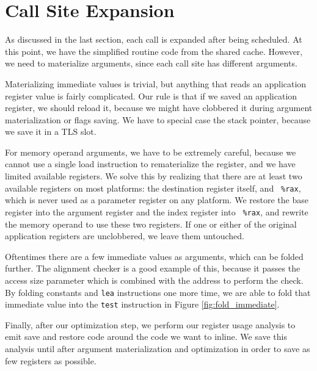 \section{Call Site Expansion}
\label{sec:site_expansion}

As discussed in the last section, each call is expanded after being scheduled.
At this point, we have the simplified routine code from the shared cache.
However, we need to materialize arguments, since each call site has different
arguments.

Materializing immediate values is trivial, but anything that reads an
application register value is fairly complicated.  Our rule is that if we saved
an application register, we should reload it, because we might have clobbered it
during argument materialization or flags saving.  We have to special case the
stack pointer, because we save it in a TLS slot.

For memory operand arguments, we have to be extremely careful, because we cannot
use a single load instruction to rematerialize the register, and we have limited
available registers.  We solve this by realizing that there are at least two
available registers on most platforms: the destination register itself, and {\tt
\%rax}, which is never used as a parameter register on any platform.  We restore
the base register into the argument register and the index register into {\tt
\%rax}, and rewrite the memory operand to use these two registers.  If one or
either of the original application registers are unclobbered, we leave them
untouched.

Oftentimes there are a few immediate values as arguments, which can be folded
further.  The alignment checker is a good example of this, because it passes the
access size parameter which is combined with the address to perform the check.
By folding constants and {\tt lea} instructions one more time, we are able to
fold that immediate value into the {\tt test} instruction in Figure
\ref{fig:fold_immediate}.

Finally, after our optimization step, we perform our register usage analysis to
emit save and restore code around the code we want to inline.  We save this
analysis until after argument materialization and optimization in order to save
as few registers as possible.
